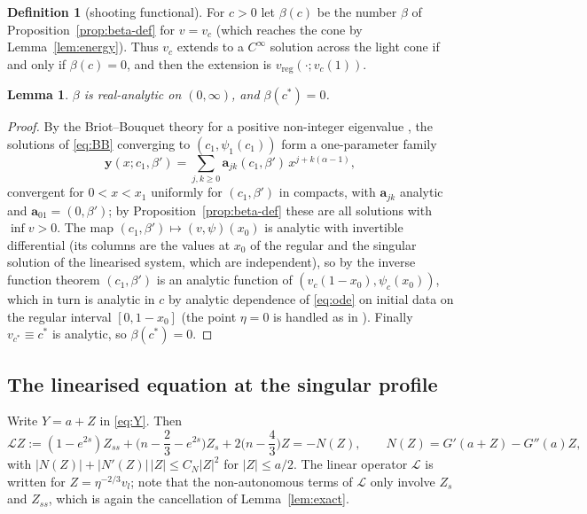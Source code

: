 \documentclass[11pt,a4paper]{amsart}
\newtheorem{lemma}[theorem]{Lemma}
\theoremstyle{definition}
\newtheorem{definition}[theorem]{Definition}
\theoremstyle{remark}
\newcommand{\cstar}{c^{*}}
\newcommand{\vreg}{v_{\mathrm{reg}}}
\begin{document}
\begin{definition}[shooting functional]\label{def:beta}
For $c>0$ let $\beta(c)$ be the number $\beta$ of Proposition~\ref{prop:beta-def} for $v=v_c$ (which reaches the cone by Lemma~\ref{lem:energy}).  Thus $v_c$ extends to a $C^\infty$ solution across the light cone if and only if $\beta(c)=0$, and then the extension is $\vreg(\cdot;v_c(1))$.
\end{definition}

\begin{lemma}\label{lem:beta-analytic}
$\beta$ is real-analytic on $(0,\infty)$, and $\beta(\cstar)=0$.
\end{lemma}
\begin{proof}
By the Briot--Bouquet theory for a positive non-integer eigenvalue \cite[Ch.~12]{Hil76}, the solutions of \eqref{eq:BB} converging to $(c_1,\psi_1(c_1))$ form a one-parameter family
\[
\mathbf y(x;c_1,\beta')=\sum_{j,k\ge0}\mathbf a_{jk}(c_1,\beta')\,x^{j+k(\alpha-1)},
\]
convergent for $0<x<x_1$ uniformly for $(c_1,\beta')$ in compacts, with $\mathbf a_{jk}$ analytic and $\mathbf a_{01}=(0,\beta')$; by Proposition~\ref{prop:beta-def} these are all solutions with $\inf v>0$.  The map $(c_1,\beta')\mapsto(v,\psi)(x_0)$ is analytic with invertible differential (its columns are the values at $x_0$ of the regular and the singular solution of the linearised system, which are independent), so by the inverse function theorem $(c_1,\beta')$ is an analytic function of $(v_c(1-x_0),\psi_c(x_0))$, which in turn is analytic in $c$ by analytic dependence of \eqref{eq:ode} on initial data on the regular interval $[0,1-x_0]$ (the point $\eta=0$ is handled as in \cite[Lemma A.3]{GHL22}).  Finally $v_{\cstar}\equiv\cstar$ is analytic, so $\beta(\cstar)=0$.
\end{proof}

\subsection{The linearised equation at the singular profile}\label{sec:linearised}
Write $Y=a+Z$ in \eqref{eq:Y}.  Then
\begin{equation}\label{eq:Zeq}
\mathcal L Z:=(1-e^{2s})Z_{ss}+\Big(n-\frac23-e^{2s}\Big)Z_s+2\Big(n-\frac43\Big)Z=-N(Z),\qquad N(Z)=G'(a+Z)-G''(a)Z ,
\end{equation}
with $|N(Z)|+|N'(Z)|\,|Z|\le C_N|Z|^2$ for $|Z|\le a/2$.  The linear operator $\mathcal L$ is \cite[(2.29)--(2.30)]{GHL22} written for $Z=\eta^{-2/3}v_l$; note that the non-autonomous terms of $\mathcal L$ only involve $Z_s$ and $Z_{ss}$, which is again the cancellation of Lemma~\ref{lem:exact}.
\end{document}
